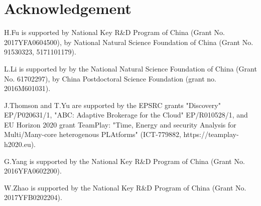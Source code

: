 \section*{Acknowledgement}

H.Fu is supported by National Key R\&D Program of China (Grant No. 2017YFA0604500), by National Natural Science Foundation of China (Grant No. 91530323, 5171101179).

L.Li is supported by by the National Natural Science Foundation of China (Grant No. 61702297), by China Postdoctoral Science Foundation (grant no. 2016M601031).

J.Thomson and T.Yu are supported by the EPSRC grants "Discovery" EP/P020631/1, "ABC: Adaptive Brokerage for the Cloud" EP/R010528/1, and EU Horizon 2020 grant TeamPlay: "Time, Energy and security Analysis for Multi/Many-core heterogenous PLAtforms" (ICT-779882, https://teamplay-h2020.eu).

G.Yang is supported by the National Key R\&D Program of China (Grant No. 2016YFA0602200).

W.Zhao is supported by the National Key R\&D Program of China (Grant No. 2017YFB0202204).










